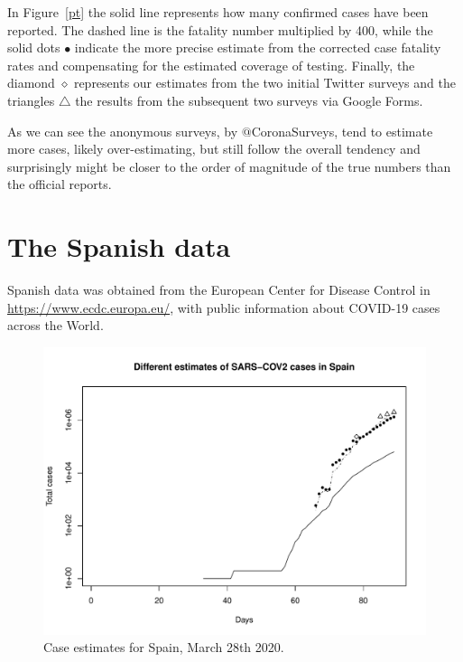 \documentclass{article}
\begin{document}
In Figure~\ref{pt} the solid line represents how many confirmed cases have been reported. The dashed line is the fatality number multiplied by 400, while the solid dots $\bullet$ indicate the more precise estimate from the corrected case fatality rates and compensating for the estimated coverage of testing. Finally, the diamond $\diamond$ represents our estimates from the two initial Twitter surveys and the triangles $\triangle$ the results from the subsequent two surveys via Google Forms. 

As we can see the anonymous surveys, by $@$CoronaSurveys, tend to estimate more cases, likely over-estimating, but still follow the overall tendency and surprisingly might be closer to the order of magnitude of the true numbers than the official reports. 

\section{The Spanish data}

Spanish data was obtained from the European Center for Disease Control in \url{https://www.ecdc.europa.eu/}, with public information about COVID-19 cases across the World. 

\begin{figure}
\begin{center}
\includegraphics[width=.9\linewidth]{EstSPMar28.pdf}
\end{center}
\caption{Case estimates for Spain, March 28th 2020.}
\label{sp}
\end{figure}
\end{document}
